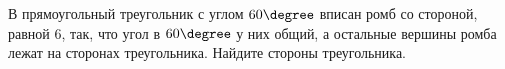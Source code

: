 \begin{ex}
	\begin{condition}
		В прямоугольный треугольник с углом \( 60\degree \) вписан ромб со стороной, равной \( 6 \), так, что угол в \( 60\degree  \) у них общий, а остальные вершины ромба лежат на сторонах треугольника.	Найдите стороны треугольника.
	\end{condition}
\end{ex}